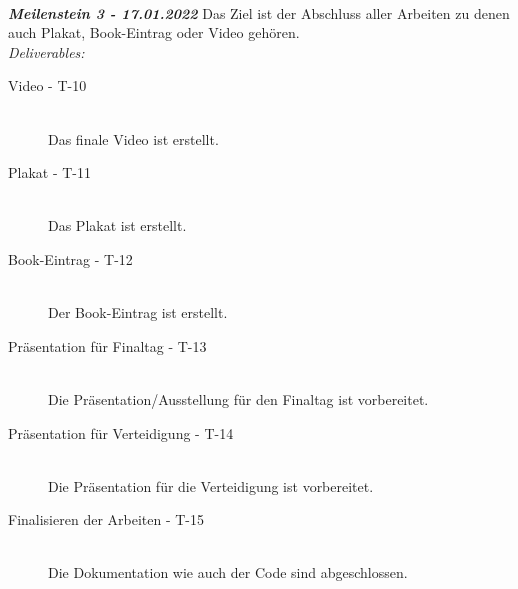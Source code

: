 ~\\

\textit{\textbf{Meilenstein 3 - 17.01.2022}}
Das Ziel ist der Abschluss aller Arbeiten zu denen auch Plakat, Book-Eintrag oder Video gehören.\\
\textit{Deliverables:}
\begin{description}
    \item[Video - T-10]\hfill \\
    Das finale Video ist erstellt.
    \item[Plakat - T-11]\hfill \\
    Das Plakat ist erstellt.
    \item[Book-Eintrag - T-12]\hfill \\
    Der Book-Eintrag ist erstellt.
    \item[Präsentation für Finaltag - T-13]\hfill \\
    Die Präsentation/Ausstellung für den Finaltag ist vorbereitet.
    \item[Präsentation für Verteidigung - T-14]\hfill \\
    Die Präsentation für die Verteidigung ist vorbereitet.
    \item[Finalisieren der Arbeiten - T-15]\hfill \\
    Die Dokumentation wie auch der Code sind abgeschlossen.
\end{description}
